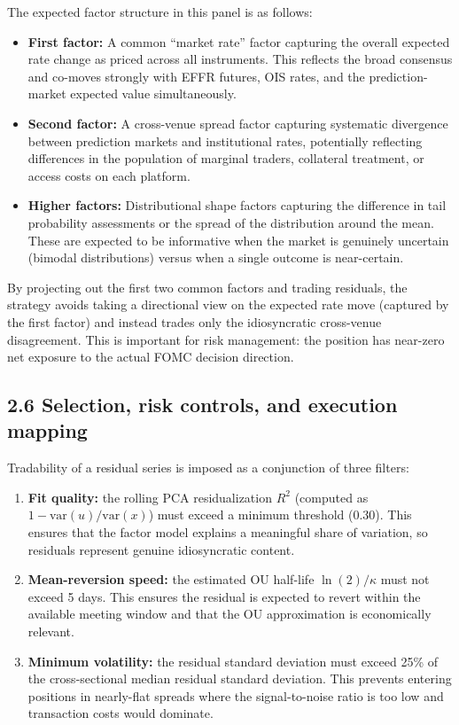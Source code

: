 The expected factor structure in this panel is as follows:
\begin{itemize}
    \item \textbf{First factor:} A common ``market rate'' factor capturing the overall expected rate change as priced across all instruments. This reflects the broad consensus and co-moves strongly with EFFR futures, OIS rates, and the prediction-market expected value simultaneously.
    \item \textbf{Second factor:} A cross-venue spread factor capturing systematic divergence between prediction markets and institutional rates, potentially reflecting differences in the population of marginal traders, collateral treatment, or access costs on each platform.
    \item \textbf{Higher factors:} Distributional shape factors capturing the difference in tail probability assessments or the spread of the distribution around the mean. These are expected to be informative when the market is genuinely uncertain (bimodal distributions) versus when a single outcome is near-certain.
\end{itemize}
By projecting out the first two common factors and trading residuals, the strategy avoids taking a directional view on the expected rate move (captured by the first factor) and instead trades only the idiosyncratic cross-venue disagreement. This is important for risk management: the position has near-zero net exposure to the actual FOMC decision direction.

\subsection*{2.6 Selection, risk controls, and execution mapping}

Tradability of a residual series is imposed as a conjunction of three filters:
\begin{enumerate}
    \item \textbf{Fit quality:} the rolling PCA residualization $R^2$ (computed as $1 - \text{var}(u)/\text{var}(x)$) must exceed a minimum threshold (0.30). This ensures that the factor model explains a meaningful share of variation, so residuals represent genuine idiosyncratic content.
    \item \textbf{Mean-reversion speed:} the estimated OU half-life $\ln(2)/\kappa$ must not exceed 5 days. This ensures the residual is expected to revert within the available meeting window and that the OU approximation is economically relevant.
    \item \textbf{Minimum volatility:} the residual standard deviation must exceed 25\% of the cross-sectional median residual standard deviation. This prevents entering positions in nearly-flat spreads where the signal-to-noise ratio is too low and transaction costs would dominate.
\end{enumerate}

